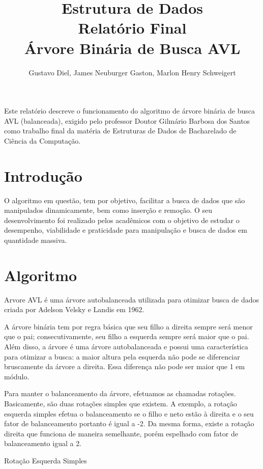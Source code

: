 \documentclass[12pt]{article}
\title{Estrutura de Dados \\ Relatório Final \\ Árvore Binária de Busca AVL}
\author{Gustavo Diel\inst{1}, James Neuburger Gaston\inst{1}, Marlon Henry Schweigert\inst{1} }
\begin{document}
 

\maketitle

     
\begin{resumo} 
  Este relatório descreve o funcionamento do algoritmo de árvore binária de busca AVL (balanceada), exigido pelo professor Doutor Gilmário Barbosa dos Santos como trabalho final da matéria de Estruturas de Dados de Bacharelado de Ciência da Computação.
\end{resumo}


\section{Introdução}

O algoritmo em questão, tem por objetivo, facilitar a busca de dados que são manipulados dinamicamente, bem como inserção e remoção. O seu desenvolvimento foi realizado pelos acadêmicos com o objetivo de estudar o desempenho, viabilidade e praticidade para manipulação e busca de dados em quantidade massiva.

\section{Algoritmo}

Arvore AVL é uma árvore autobalanceada utilizada para otimizar busca de dados criada por Adelson Velsky e Landis em 1962.

A árvore binária tem por regra básica que seu filho a direita sempre será menor que o pai; consecutivamente, seu filho a esquerda sempre será maior que o pai. Além disso, a árvore é uma árvore autobalanceada e possui uma característica para otimizar a busca: a maior altura pela esquerda não pode se diferenciar bruscamente da árvore a direita. Essa diferença não pode ser maior que 1 em módulo.

Para manter o balanceamento da árvore, efetuamos as chamadas rotações. Basicamente, são duas rotações simples que existem. A exemplo, a rotação esquerda simples efetua o balanceamento se o filho e neto estão à direita e o seu fator de balanceamento portanto é igual a -2. Da mesma forma, existe a rotação direita que funciona de maneira semelhante, porém espelhado com  fator de balanceamento igual a 2.


Rotação Esquerda Simples

\begin{center}
\end{center}
\end{document}
